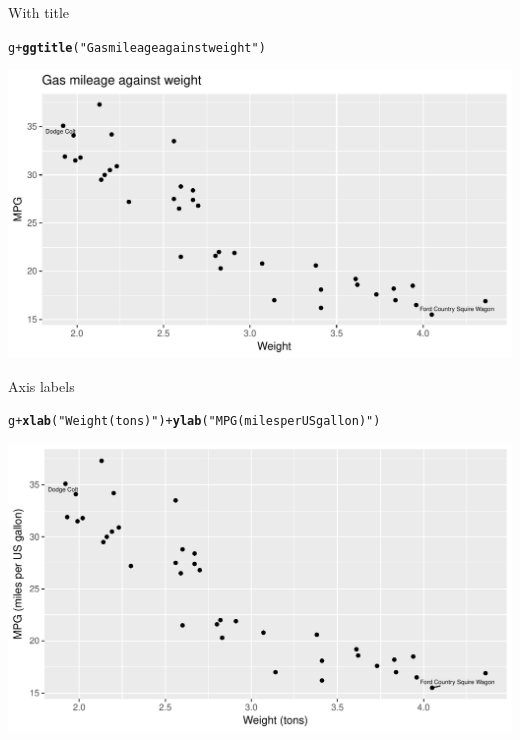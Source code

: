 \documentclass[unknownkeysallowed]{beamer}\usepackage[]{graphicx}\usepackage[]{color}
\makeatletter
\def\maxwidth{ %
  \ifdim\Gin@nat@width>\linewidth
    \linewidth
  \else
    \Gin@nat@width
  \fi
}
\newcommand{\hlstr}[1]{\textcolor[rgb]{0.192,0.494,0.8}{#1}}%
\newcommand{\hlopt}[1]{\textcolor[rgb]{0,0,0}{#1}}%
\newcommand{\hlstd}[1]{\textcolor[rgb]{0.345,0.345,0.345}{#1}}%
\newcommand{\hlkwd}[1]{\textcolor[rgb]{0.737,0.353,0.396}{\textbf{#1}}}%
\newenvironment{kframe}{%
 \def\at@end@of@kframe{}%
 \ifinner\ifhmode%
  \def\at@end@of@kframe{\end{minipage}}%
  \begin{minipage}{\columnwidth}%
 \fi\fi%
 \def\FrameCommand##1{\hskip\@totalleftmargin \hskip-\fboxsep
 \colorbox{shadecolor}{##1}\hskip-\fboxsep
     \hskip-\linewidth \hskip-\@totalleftmargin \hskip\columnwidth}%
 \MakeFramed {\advance\hsize-\width
   \@totalleftmargin\z@ \linewidth\hsize
   \@setminipage}}%
 {\par\unskip\endMakeFramed%
 \at@end@of@kframe}
\newenvironment{knitrout}{}{} %
\makeatother
\begin{document}
\begin{frame}[fragile]{With title}
  
\begin{knitrout}
\color{fgcolor}\begin{kframe}
\begin{alltt}
\hlstd{g}\hlopt{+}\hlkwd{ggtitle}\hlstd{(}\hlstr{"Gas mileage against weight"}\hlstd{)}
\end{alltt}
\end{kframe}
\includegraphics[width=\maxwidth]{figure/unnamed-chunk-415-1} 

\end{knitrout}
  
\end{frame}

\begin{frame}[fragile]{Axis labels}
  
\begin{knitrout}
\color{fgcolor}\begin{kframe}
\begin{alltt}
\hlstd{g}\hlopt{+}\hlkwd{xlab}\hlstd{(}\hlstr{"Weight (tons)"}\hlstd{)}\hlopt{+}\hlkwd{ylab}\hlstd{(}\hlstr{"MPG (miles per US gallon)"}\hlstd{)}
\end{alltt}
\end{kframe}
\includegraphics[width=\maxwidth]{figure/unnamed-chunk-416-1} 

\end{knitrout}
  
\end{frame}
\end{document}
